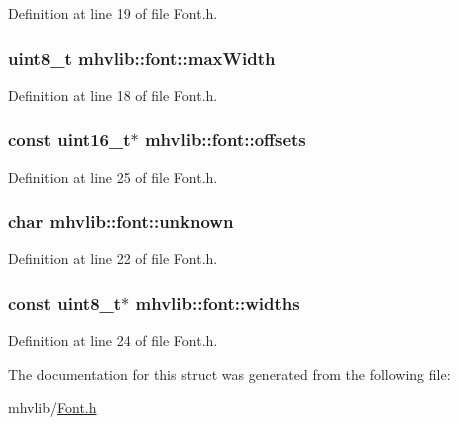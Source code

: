 Definition at line 19 of file Font.\-h.

\hypertarget{structmhvlib_1_1font_a491f7e655d97619153af9e477fa4a384}{
\subsubsection[{max\-Width}]{\setlength{\rightskip}{0pt plus 5cm}uint8\-\_\-t mhvlib\-::font\-::max\-Width}}\label{structmhvlib_1_1font_a491f7e655d97619153af9e477fa4a384}


Definition at line 18 of file Font.\-h.

\hypertarget{structmhvlib_1_1font_acb130c182d0ee5ba43aee7b00e1e9fad}{
\subsubsection[{offsets}]{\setlength{\rightskip}{0pt plus 5cm}const uint16\-\_\-t$\ast$ mhvlib\-::font\-::offsets}}\label{structmhvlib_1_1font_acb130c182d0ee5ba43aee7b00e1e9fad}


Definition at line 25 of file Font.\-h.

\hypertarget{structmhvlib_1_1font_afc2c3bb2a37e1563ac0564553e535971}{
\subsubsection[{unknown}]{\setlength{\rightskip}{0pt plus 5cm}char mhvlib\-::font\-::unknown}}\label{structmhvlib_1_1font_afc2c3bb2a37e1563ac0564553e535971}


Definition at line 22 of file Font.\-h.

\hypertarget{structmhvlib_1_1font_a28889052cc78935d95331e63af5dd389}{
\subsubsection[{widths}]{\setlength{\rightskip}{0pt plus 5cm}const uint8\-\_\-t$\ast$ mhvlib\-::font\-::widths}}\label{structmhvlib_1_1font_a28889052cc78935d95331e63af5dd389}


Definition at line 24 of file Font.\-h.



The documentation for this struct was generated from the following file\-:\begin{DoxyCompactItemize}
\item 
mhvlib/\hyperlink{_font_8h}{Font.\-h}\end{DoxyCompactItemize}
